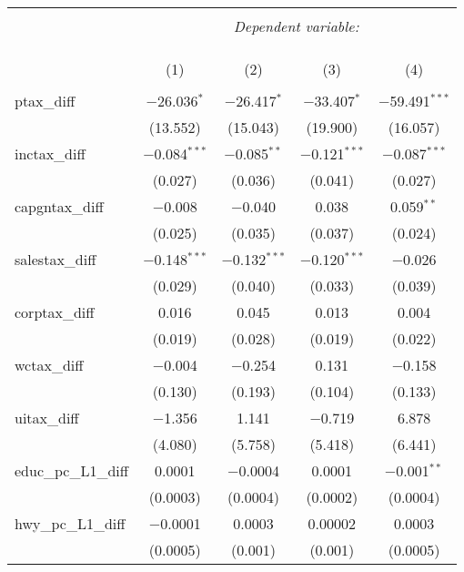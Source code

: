 
\begin{table}[!htbp] \centering 
  \caption{} 
  \label{} 
\begin{tabular}{@{\extracolsep{5pt}}lcccc} 
\\[-1.8ex]\hline 
\hline \\[-1.8ex] 
 & \multicolumn{4}{c}{\textit{Dependent variable:}} \\ 
\cline{2-5} 
\\[-1.8ex] & \multicolumn{4}{c}{ } \\ 
\\[-1.8ex] & (1) & (2) & (3) & (4)\\ 
\hline \\[-1.8ex] 
 ptax\_diff & $-$26.036$^{*}$ & $-$26.417$^{*}$ & $-$33.407$^{*}$ & $-$59.491$^{***}$ \\ 
  & (13.552) & (15.043) & (19.900) & (16.057) \\ 
  inctax\_diff & $-$0.084$^{***}$ & $-$0.085$^{**}$ & $-$0.121$^{***}$ & $-$0.087$^{***}$ \\ 
  & (0.027) & (0.036) & (0.041) & (0.027) \\ 
  capgntax\_diff & $-$0.008 & $-$0.040 & 0.038 & 0.059$^{**}$ \\ 
  & (0.025) & (0.035) & (0.037) & (0.024) \\ 
  salestax\_diff & $-$0.148$^{***}$ & $-$0.132$^{***}$ & $-$0.120$^{***}$ & $-$0.026 \\ 
  & (0.029) & (0.040) & (0.033) & (0.039) \\ 
  corptax\_diff & 0.016 & 0.045 & 0.013 & 0.004 \\ 
  & (0.019) & (0.028) & (0.019) & (0.022) \\ 
  wctax\_diff & $-$0.004 & $-$0.254 & 0.131 & $-$0.158 \\ 
  & (0.130) & (0.193) & (0.104) & (0.133) \\ 
  uitax\_diff & $-$1.356 & 1.141 & $-$0.719 & 6.878 \\ 
  & (4.080) & (5.758) & (5.418) & (6.441) \\ 
  educ\_pc\_L1\_diff & 0.0001 & $-$0.0004 & 0.0001 & $-$0.001$^{**}$ \\ 
  & (0.0003) & (0.0004) & (0.0002) & (0.0004) \\ 
  hwy\_pc\_L1\_diff & $-$0.0001 & 0.0003 & 0.00002 & 0.0003 \\ 
  & (0.0005) & (0.001) & (0.001) & (0.0005) \\ 

\end{tabular}
\end{table}

